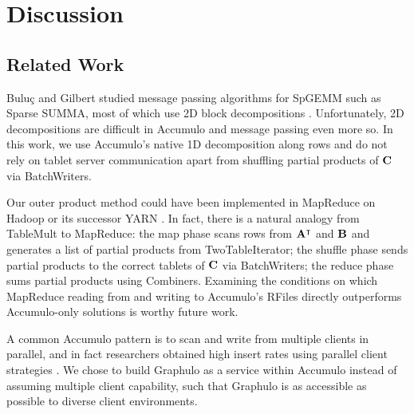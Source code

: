
\section{Discussion}
\label{sDiscussion}

\subsection{Related Work} %
Bulu\c{c} and Gilbert studied message passing algorithms for SpGEMM
such as Sparse SUMMA, most of which use 2D block decompositions \cite{buluc2012parallel}.
Unfortunately, 2D decompositions are difficult in Accumulo 
and message passing even more so.
In this work, we use Accumulo's native 1D decomposition along rows 
and do not rely on tablet server communication
apart from shuffling partial products of $\mathbf{C}$ via BatchWriters.


Our outer product method could have been implemented in MapReduce %
on Hadoop or its successor YARN \cite{vavilapalli2013apache}.
In fact, there is a natural analogy from TableMult to MapReduce:
the map phase scans rows from $\mathbf{A^{\intercal}}$ and $\mathbf{B}$
and generates a list of partial products from TwoTableIterator;
the shuffle phase sends partial products to the correct tablets of $\mathbf{C}$ via BatchWriters;
the reduce phase sums partial products using Combiners.
Examining the conditions on which MapReduce 
reading from and writing to Accumulo's RFiles directly
outperforms Accumulo-only solutions
is worthy future work.


A common Accumulo pattern is to 
scan and write from multiple clients in parallel,
and in fact researchers obtained 
high insert rates using parallel client strategies \cite{kepner2014achieving}.
We chose to build Graphulo as a service within Accumulo
instead of assuming multiple client capability,
such that Graphulo is as accessible as possible to diverse client environments.

